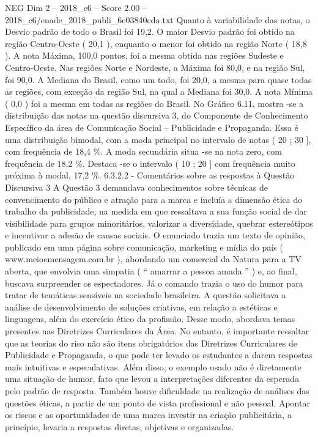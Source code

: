 \begin{textsample}{NEG Dim 2 – 2018\_c6 – Score 2.00 – 2018\_c6/enade\_2018\_publi\_6e03840cda.txt}
Quanto à variabilidade das notas, o Desvio padrão de todo o Brasil foi 19,2.
O maior Desvio padrão foi obtido na região Centro-Oeste ( 20,1 ), enquanto o menor foi obtido na região Norte ( 18,8 ).
A nota Máxima, 100,0 pontos, foi a mesma obtida nas regiões Sudeste e Centro-Oeste.
Nas regiões Norte e Nordeste, a Máxima foi 80,0, e na região Sul, foi 90,0.
A Mediana do Brasil, como um todo, foi 20,0, a mesma para quase todas as regiões, com exceção da região Sul, na qual a Mediana foi 30,0.
A nota Mínima ( 0,0 ) foi a mesma em todas as regiões do Brasil.
No Gráfico 6.11, mostra -se a distribuição das notas na questão discursiva 3, do Componente de Conhecimento Específico da área de Comunicação Social – Publicidade e Propaganda.
Essa é uma distribuição bimodal, com a moda principal no intervalo de notas ( 20 ; 30 ], com frequência de 18,4 \%.
A moda secundária situa -se na nota zero, com frequência de 18,2 \%.
Destaca -se o intervalo ( 10 ; 20 ] com frequência muito próxima à modal, 17,2 \%. 6.3.2.2 - Comentários sobre as respostas à Questão Discursiva 3 A Questão 3 demandava conhecimentos sobre técnicas de convencimento do público e atração para a marca e incluía a dimensão ética do trabalho da publicidade, na medida em que ressaltava a sua função social de dar visibilidade para grupos minoritários, valorizar a diversidade, quebrar estereótipos e incentivar a adesão de causas sociais.
O enunciado trazia um texto de opinião, publicado em uma página sobre comunicação, marketing e mídia do país ( www.meioemensagem.com.br ), abordando um comercial da Natura para a TV aberta, que envolvia uma simpatia ( “ amarrar a pessoa amada ” ) e, ao final, buscava surpreender os espectadores.
Já o comando trazia o uso do humor para tratar de temáticas sensíveis na sociedade brasileira.
A questão solicitava a análise de desenvolvimento de soluções criativas, em relação a estéticas e linguagens, além do exercício ético da profissão.
Desse modo, abordava temas presentes nas Diretrizes Curriculares da Área.
No entanto, é importante ressaltar que as teorias do riso não são itens obrigatórios das Diretrizes Curriculares de Publicidade e Propaganda, o que pode ter levado os estudantes a darem respostas mais intuitivas e especulativas.
Além disso, o exemplo usado não é diretamente uma situação de humor, fato que levou a interpretações diferentes da esperada pelo padrão de resposta.
Também houve dificuldade na realização de análises das questões éticas, a partir de um ponto de vista profissional e não pessoal.
Apontar os riscos e as oportunidades de uma marca investir na criação publicitária, a princípio, levaria a respostas diretas, objetivas e organizadas.

\end{textsample}
